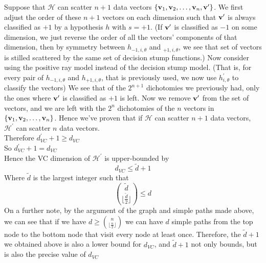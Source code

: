 \documentclass[11pt]{article}
\theoremstyle{definition}
\begin{document}
 Suppose that $\mathcal{H}$ can scatter $n + 1$ data vectors $\{\vb{v}_1, \vb{v}_2,\dots,\vb{v}_n, \vb{v}^\prime\}$. We first adjust the order of these $n + 1$ vectors on each dimension such that $\vb{v}^\prime$ is always classified as $+1$ by a hypothesis $h$ with $s = +1$. (If $\vb{v}^\prime$ is classified as $-1$ on some dimension, we just reverse the order of all the vectors' components of that dimension, then by symmetry between $h_{-1, i, \theta}$ and $_{+1, i, \theta}$, we see that set of vectors is stilled scattered by the same set of decision stump functions.) Now consider using the positive ray model instead of the decision stump model. (That is, for every pair of $h_{-1, i, \theta}$ and $h_{+1, i, \theta}$, that is previously used, we now use $h^\prime_{i, \theta}$ to classify the vectors) We see that of the $2^{n + 1}$ dichotomies we previously had, only the ones where $\vb{v}^\prime$ is classified as $+1$ is left. Now we remove $\vb{v}^\prime$ from the set of vectors, and we are left with the $2^n$ dichotomies of the $n$ vectors in $\{\vb{v}_1, \vb{v}_2,\dots,\vb{v}_n\}$. Hence we've proven that if $\mathcal{H}$ can scatter $n + 1$ data vectors, $\mathcal{H}^\prime$ can scatter $n$ data vectors. \\ 
 Therefore $d^\prime_{VC} + 1 \geq d_{VC}$ \\
So $d^\prime_{VC} + 1 = d_{VC}$ \\
\medbreak
 Hence the VC dimension of $\mathcal{H}^\prime$ is upper-bounded by
 \[
   d_{VC} \leq \tilde{d} + 1
 \]
 Where $\tilde{d}$ is the largest integer such that 
 \[
   {\tilde{d}\choose \lfloor\frac{\tilde{d}}{2}\rfloor} \leq d
 \]
 \bigbreak
 On a further note, by the argument of the graph and simple paths made above, we can see that if we have $d \geq {n\choose \lfloor\frac{n}{2}\rfloor}$ we can have $d$ simple paths from the top node to the bottom node that visit every node at least once. Therefore, the $\tilde{d} + 1$ we obtained above is also a lower bound for $d_{VC}$, and $\tilde{d} + 1$ not only bounds, but is also the precise value of $d_{VC}$
\end{document}
